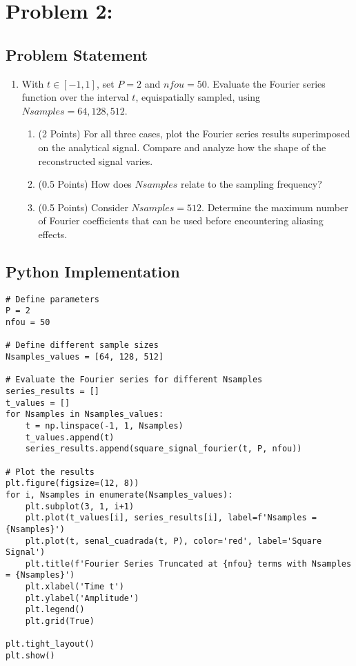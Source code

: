 \documentclass[10pt]{article}
\theoremstyle{definition}
\theoremstyle{remark}
\theoremstyle{definition}
\numberwithin{equation}{prob}
\begin{document}
\section*{Problem 2:}

\subsection*{Problem Statement}


\begin{enumerate}
    \item With \( t \in [-1, 1] \), set \( P = 2 \) and \( nfou = 50 \). Evaluate the Fourier series function over the interval \( t \), equispatially sampled, using \( Nsamples = 64, 128, 512 \).
    \begin{enumerate}
        \item (2 Points) For all three cases, plot the Fourier series results superimposed on the analytical signal. Compare and analyze how the shape of the reconstructed signal varies.
        \item (0.5 Points) How does \( Nsamples \) relate to the sampling frequency?
        \item (0.5 Points) Consider \( Nsamples = 512 \). Determine the maximum number of Fourier coefficients that can be used before encountering aliasing effects.
    \end{enumerate}
\end{enumerate}


\subsection*{Python Implementation}

\begin{lstlisting}
# Define parameters
P = 2
nfou = 50

# Define different sample sizes
Nsamples_values = [64, 128, 512]

# Evaluate the Fourier series for different Nsamples
series_results = []
t_values = []
for Nsamples in Nsamples_values:
    t = np.linspace(-1, 1, Nsamples)
    t_values.append(t)
    series_results.append(square_signal_fourier(t, P, nfou))

# Plot the results
plt.figure(figsize=(12, 8))
for i, Nsamples in enumerate(Nsamples_values):
    plt.subplot(3, 1, i+1)
    plt.plot(t_values[i], series_results[i], label=f'Nsamples = {Nsamples}')
    plt.plot(t, senal_cuadrada(t, P), color='red', label='Square Signal')
    plt.title(f'Fourier Series Truncated at {nfou} terms with Nsamples = {Nsamples}')
    plt.xlabel('Time t')
    plt.ylabel('Amplitude')
    plt.legend()
    plt.grid(True)

plt.tight_layout()
plt.show()
\end{lstlisting}
\end{document}
